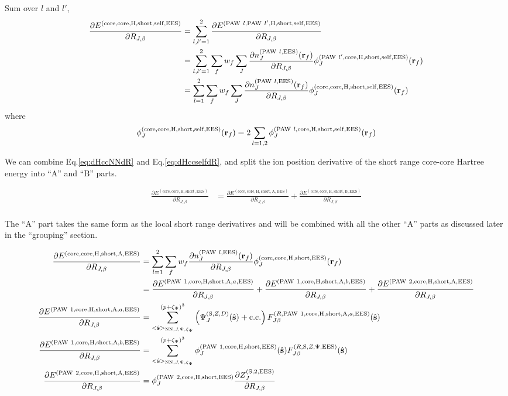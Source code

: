 \documentclass[paper=a4, fontsize=11pt]{article} %
\numberwithin{equation}{section} %
\numberwithin{figure}{section} %
\numberwithin{table}{section} %
\newcommand{\p}{\partial}
\newcommand{\bs}{{\bf{s}}}
\newcommand{\br}{{\bf{r}}}
\newcommand{\hs}{{\hat{\bf{s}}}}
\newcommand{\rS}{{\mathrm{S}}}
\newcommand{\rEES}{{\mathrm{EES}}}
\newcommand{\rcore}{{\mathrm{core}}}
\newcommand{\rNN}{{\mathrm{NN}}}
\newcommand{\rself}{{\mathrm{self}}}
\newcommand{\rshort}{{\mathrm{short}}}
\newcommand{\rcc}{{\mathrm{c.c.}}}
\newcommand{\rP}{{\mathrm{PAW}}}
\newcommand{\rH}{{\mathrm{H}}}
\newcommand{\rA}{{\mathrm{A}}}
\newcommand{\rB}{{\mathrm{B}}}
\newcommand{\RJb}{{R_{J,\beta}}}
\newcommand{\pzp}{{(p+\zeta_{\Psi})^3}}
\newcommand{\hsJp}{{<\hs>_{\rNN,J,\Psi,\zeta_\Psi}}}
\begin{document}
Sum over $l$ and $l'$,
\begin{equation}\label{eq:dHccselfdR}
\begin{split}
\frac{\p E^{(\rcore,\rcore,\rH,\rshort,\rself,\rEES)}}{\p \RJb}
&=\sum_{l,l'=1}^2\frac{\p E^{(\rP\ l,\rP\ l',\rH,\rshort,\rself,\rEES)}}{\p \RJb}\\
&= \sum_{l,l'=1}^2\sum_{f} w_f \sum_J \frac{\p n_J^{(\rP\ l,\rEES)}(\br_f) }{\p \RJb}\phi_J^{(\rP\ l',\rcore,\rH,\rshort,\rself,\rEES)}(\br_f)\\
&= \sum_{l=1}^2\sum_{f} w_f \sum_J \frac{\p n_J^{(\rP\ l,\rEES)}(\br_f) }{\p \RJb}\phi_J^{(\rcore,\rcore,\rH,\rshort,\rself,\rEES)}(\br_f) \\
\end{split}
\end{equation}
where
\begin{equation}
\phi_J^{(\rcore,\rcore,\rH,\rshort,\rself,\rEES)}(\br_f) = 2 \sum_{l=1,2}\phi_J^{(\rP\ l,\rcore,\rH,\rshort,\rself,\rEES)}(\br_f)
\end{equation}

We can combine Eq.\eqref{eq:dHccNNdR} and Eq.\eqref{eq:dHccselfdR}, and split the ion position derivative of the short range core-core Hartree energy into ``$\rA$'' and ``$\rB$'' parts.

\begin{equation}
\begin{split}
\frac{\p E^{(\rcore,\rcore,\rH,\rshort,\rEES)}}{\p \RJb}&=\frac{\p E^{(\rcore,\rcore,\rH,\rshort,\rA,\rEES)}}{\p \RJb}+\frac{\p E^{(\rcore,\rcore,\rH,\rshort,\rB,\rEES)}}{\p \RJb} \\
\end{split}
\end{equation}

The ``$\rA$'' part takes the same form as the local short range derivatives and will be combined with all the other ``$\rA$'' parts as discussed later in the ``grouping'' section.

\begin{equation}
\begin{split}
\frac{\p E^{(\rcore,\rcore,\rH,\rshort,\rA,\rEES)}}{\p \RJb}
&= \sum_{l=1}^2\sum_f w_f \frac{\p n_J^{(\rP\ l,\rEES)}(\br_f)}{\p \RJb}\phi_J^{(\rcore,\rcore,\rH,\rshort,\rEES)}(\br_f)\\
&= \frac{\p E^{(\rP\ 1,\rcore,\rH,\rshort,\rA,a,\rEES)}}{\p \RJb} + \frac{\p E^{(\rP\ 1,\rcore,\rH,\rshort,\rA,b,\rEES)}}{\p \RJb} + \frac{\p E^{(\rP\ 2,\rcore,\rH,\rshort,\rA,\rEES)}}{\p \RJb}\\
\frac{\p E^{(\rP\ 1,\rcore,\rH,\rshort,\rA,a,\rEES)}}{\p \RJb}
&=\sum_{\hsJp}^{\pzp} \left(\Psi_J^{(\rS,Z,D)}(\hat \bs)+ \rcc\right) F_{J\beta}^{(R,\rP\ 1,\rcore,\rH,\rshort,\rA,a,\rEES)}(\hs)\\
\frac{\p E^{(\rP\ 1,\rcore,\rH,\rshort,\rA,b,\rEES)}}{\p \RJb}
&=\sum_{\hsJp}^{\pzp} \phi_J^{(\rP\ 1,\rcore,\rH,\rshort,\rEES)}(\hs)F_{J\beta}^{(R,\rS,Z,\Psi,\rEES)}(\hs)\\
\frac{\p E^{(\rP\ 2,\rcore,\rH,\rshort,\rA,\rEES)}}{\p \RJb}
&= \phi_J^{(\rP\ 2,\rcore,\rH,\rshort,\rEES)}\frac{\p Z_{J}^{(\rS,2,\rEES)}}{\p \RJb}
\end{split}
\end{equation}
\end{document}
